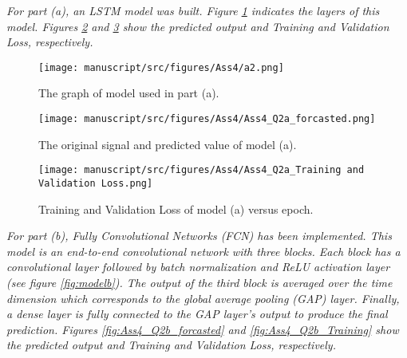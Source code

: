 \textit{For part (a), an LSTM model was built. Figure \ref{fig:modela} indicates the layers of this model. Figures \ref{fig:Ass4_Q2a_forcasted} and \ref{fig:Ass4_Q2a_Training} show the predicted output and Training and Validation Loss, respectively.}


\begin{figure}[H]
    \centering
    \begin{minipage}[b]{0.5\textwidth}
        \texttt{[image: manuscript/src/figures/Ass4/a2.png]}
    \end{minipage}
    \caption{The graph of model used in part (a).}
    \label{fig:modela}
\end{figure}

\begin{figure}[H]
    \centering
    \begin{minipage}[b]{1\textwidth}
        \texttt{[image: manuscript/src/figures/Ass4/Ass4\_Q2a\_forcasted.png]}
    \end{minipage}
    \caption{The original signal and predicted value of model (a).}
    \label{fig:Ass4_Q2a_forcasted}
\end{figure}

\begin{figure}[H]
    \centering
    \begin{minipage}[b]{1\textwidth}
        \texttt{[image: manuscript/src/figures/Ass4/Ass4\_Q2a\_Training and Validation Loss.png]}
    \end{minipage}
    \caption{Training and Validation Loss of model (a) versus epoch.}
    \label{fig:Ass4_Q2a_Training}
\end{figure}














\textit{For part (b), Fully Convolutional Networks (FCN) \cite{WangTimeBaseline} has been implemented. This model is an end-to-end convolutional network with three blocks. Each block has a convolutional layer followed by batch normalization and ReLU activation layer (see figure \ref{fig:modelb}). The output of the third block is averaged over the time dimension which corresponds to the global average pooling (GAP) layer. Finally, a dense layer is fully connected to the GAP layer’s output to produce the final prediction. Figures \ref{fig:Ass4_Q2b_forcasted} and \ref{fig:Ass4_Q2b_Training} show the predicted output and Training and Validation Loss, respectively. }

